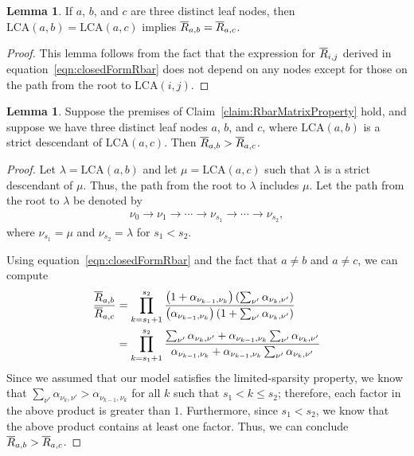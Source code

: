 \documentclass{article}
\theoremstyle{definition}
\newtheorem{lemma}[thm]{Lemma}
\begin{document}
\begin{lemma}
If $a$, $b$, and $c$ are three distinct leaf nodes, then $\text{LCA}(a,b) = \text{LCA}(a,c)$ implies $\overline{R}_{a,b} = \overline{R}_{a,c}$.
\label{lemma:equalLCA}
\end{lemma}

\begin{proof}
This lemma follows from the fact that the expression for $\overline{R}_{i,j}$ derived in equation~\eqref{eqn:closedFormRbar} does not depend on any nodes except for those on the path from the root to $\text{LCA}(i,j)$.
\end{proof}

\begin{lemma}
Suppose the premises of Claim~\ref{claim:RbarMatrixProperty} hold, and suppose we have three distinct leaf nodes $a$, $b$, and $c$, where $\text{LCA}(a,b)$ is a strict descendant of $\text{LCA}(a,c)$.
Then $\overline{R}_{a,b} > \overline{R}_{a,c}$.
\label{lemma:greaterLCA}
\end{lemma}

\begin{proof}
Let $\lambda = \text{LCA}(a,b)$ and let $\mu = \text{LCA}(a,c)$ such that $\lambda$ is a strict descendant of $\mu$.
Thus, the path from the root to $\lambda$ includes $\mu$.
Let the path from the root to $\lambda$ be denoted by
\begin{align*}
\nu_0 \to \nu_1 \to \cdots \to \nu_{s_1} \to \cdots \to \nu_{s_2},
\end{align*}
where $\nu_{s_1} = \mu$ and $\nu_{s_2} = \lambda$ for $s_1 < s_2$.

Using equation~\eqref{eqn:closedFormRbar} and the fact that $a \neq b$ and $a \neq c$, we can compute
\begin{align}
\frac{\overline{R}_{a,b}}{\overline{R}_{a,c}}
&=
\prod_{k=s_1+1}^{s_2}
\frac
  { \left( 1 + \alpha_{\nu_{k-1}, \nu_k} \right) \left( \sum_{\nu'} \alpha_{\nu_k, \nu'} \right) }
  { \left( \alpha_{\nu_{k-1}, \nu_k} \right) \left( 1 + \sum_{\nu'} \alpha_{\nu_k, \nu'} \right) }
\\
&=
\prod_{k=s_1+1}^{s_2}
\frac
  { \sum_{\nu'} \alpha_{\nu_k, \nu'} + \alpha_{\nu_{k-1}, \nu_k} \sum_{\nu'} \alpha_{\nu_k, \nu'} }
  { \alpha_{\nu_{k-1}, \nu_k} + \alpha_{\nu_{k-1}, \nu_k} \sum_{\nu'} \alpha_{\nu_k, \nu'} }
\end{align}
%
Since we assumed that our model satisfies the limited-sparsity property, we know that $\sum_{\nu'} \alpha_{\nu_k, \nu'} > \alpha_{\nu_{k-1}, \nu_k}$ for all $k$ such that $s_1 < k \leq s_2$; therefore, each factor in the above product is greater than $1$.
Furthermore, since $s_1 < s_2$, we know that the above product contains at least one factor.
Thus, we can conclude $\overline{R}_{a,b} > \overline{R}_{a,c}$.
\end{proof}
\end{document}
